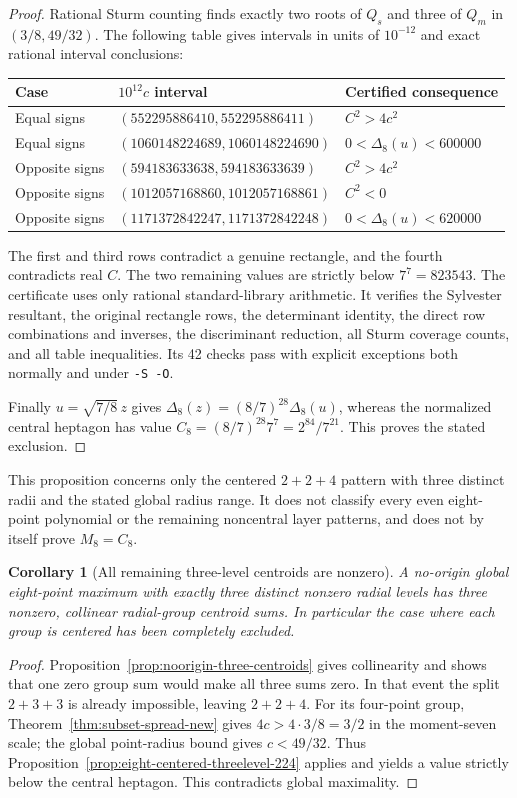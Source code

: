 \documentclass[11pt]{article}
\newtheorem{corollary}[theorem]{Corollary}
\theoremstyle{remark}
\numberwithin{equation}{section}
\begin{document}
\begin{proof}
Rational Sturm counting finds exactly two roots of $Q_s$ and three
of $Q_m$ in $(3/8,49/32)$. The following table gives intervals in
units of $10^{-12}$ and exact rational interval conclusions:
\begin{center}
\begin{tabular}{lll}
\toprule
Case&$10^{12}c$ interval&Certified consequence\\
\midrule
Equal signs&$(552295886410,552295886411)$&$C^2>4c^2$\\
Equal signs&$(1060148224689,1060148224690)$&$0<\Delta_8(u)<600000$\\
Opposite signs&$(594183633638,594183633639)$&$C^2>4c^2$\\
Opposite signs&$(1012057168860,1012057168861)$&$C^2<0$\\
Opposite signs&$(1171372842247,1171372842248)$&$0<\Delta_8(u)<620000$\\
\bottomrule
\end{tabular}
\end{center}
The first and third rows contradict a genuine rectangle, and the
fourth contradicts real $C$. The two remaining values are strictly
below $7^7=823543$. The certificate
 uses only rational
standard-library arithmetic. It verifies the Sylvester resultant,
the original rectangle rows, the determinant identity, the direct row
combinations and inverses, the discriminant reduction, all Sturm
coverage counts, and all table inequalities. Its 42 checks pass with
explicit exceptions both normally and under \texttt{-S -O}.

Finally $u=\sqrt{7/8}\,z$ gives
$\Delta_8(z)=(8/7)^{28}\Delta_8(u)$, whereas the normalized
central heptagon has value
$C_8=(8/7)^{28}7^7=2^{84}/7^{21}$.
This proves the stated exclusion.
\end{proof}

This proposition concerns only the centered $2+2+4$ pattern with
three distinct radii and the stated global radius range. It does not
classify every even eight-point polynomial or the remaining
noncentral layer patterns, and does not by itself prove $M_8=C_8$.

\begin{corollary}[All remaining three-level centroids are nonzero]
\label{cor:n8-threelevel-nonzero-centroids}
A no-origin global eight-point maximum with exactly three distinct
nonzero radial levels has three nonzero, collinear radial-group
centroid sums. In particular the case where each group is centered
has been completely excluded.
\end{corollary}
\begin{proof}
Proposition~\ref{prop:noorigin-three-centroids} gives collinearity
and shows that one zero group sum would make all three sums zero.
In that event the split $2+3+3$ is already impossible, leaving $2+2+4$.
For its four-point group, Theorem~\ref{thm:subset-spread-new} gives
$4c>4\cdot3/8=3/2$ in the moment-seven scale; the global point-radius
bound gives $c<49/32$. Thus Proposition~\ref{prop:eight-centered-threelevel-224}
applies and yields a value strictly below the central heptagon.
This contradicts global maximality.
\end{proof}
\end{document}
